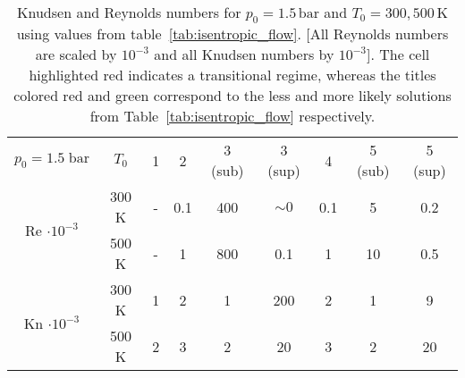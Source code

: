 \begin{table}[H]
    \centering
    \renewcommand{\arraystretch}{1.2}
    \begin{tabular}{|c|c|c|c|c|c|c|c|c|}
    \hline
    \multirow{2}{*}{\small $p_0 = 1.5\;\text{bar}$} 
        & \multirow{2}{*}{$T_0$} 
        & \multirow{2}{*}{1} 
        & \multirow{2}{*}{2} 
        & \multirow{2}{*}{\color{greenColor} 3 (sub)} 
        & \multirow{2}{*}{\color{redColor} 3 (sup)} 
        & \multirow{2}{*}{4} 
        & \multirow{2}{*}{\color{redColor} 5 (sub)} 
        & \multirow{2}{*}{\color{greenColor} 5 (sup)} \\
    & & & & & & & & \\ \hline

    \multirow{2}{*}{Re $\cdot10^{-3}$} 
      & 300 K 
          & - 
          & 0.1 
          & 400 
          & $\sim 0$ 
          & 0.1 
          & 5 
          & 0.2 \\ \cline{2-9}
      & 500 K 
          & - 
          & 1 
          & 800 
          & 0.1 
          & 1 
          & 10 
          & 0.5 \\ \hline

    \multirow{2}{*}{Kn $\cdot10^{-3}$} 
      & 300 K 
          & 1 
          & 2 
          & 1 
          & \cellcolor[HTML]{FFADA8}200 
          & 2 
          & 1 
          & 9 \\ \cline{2-9}
      & 500 K 
          & 2 
          & 3 
          & 2 
          & 20 
          & 3 
          & 2 
          & 20 \\ \hline
    \end{tabular}
    \caption{Knudsen and Reynolds numbers for $p_0 = 1.5\,\mathrm{bar}$ and $T_0 = 300, 500\,\mathrm{K}$ using values from table~\ref{tab:isentropic_flow}. [All Reynolds numbers are scaled by $10^{-3}$ and all Knudsen numbers by $10^{-3}$]. The cell highlighted red indicates a transitional regime, whereas the titles colored red and green correspond to the less and more likely solutions from Table~\ref{tab:isentropic_flow} respectively.}
    \label{tab:test-knudsen-reynolds-isentropic}
\end{table}
